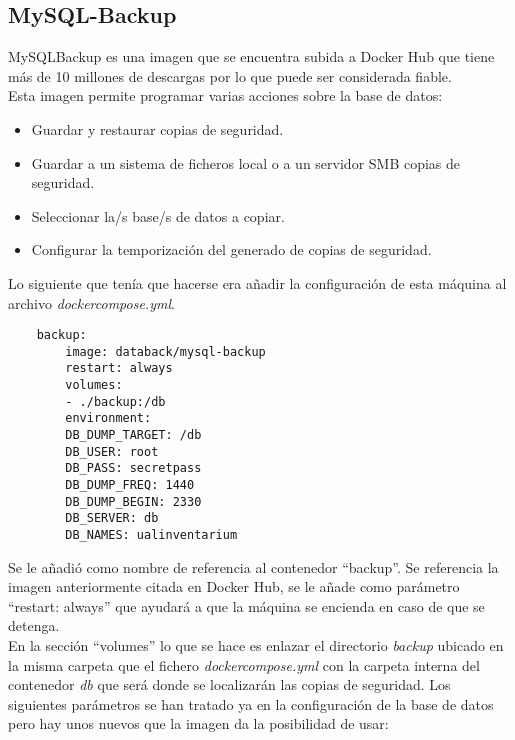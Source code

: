 \subsection{MySQL-Backup}
MySQL\-Backup es una imagen que se encuentra subida a Docker Hub que tiene más de 10 millones de descargas por lo que puede ser considerada fiable.
\\Esta imagen permite programar varias acciones sobre la base de datos:
\begin{itemize}
    \item Guardar y restaurar copias de seguridad.
    \item Guardar a un sistema de ficheros local o a un servidor SMB copias de seguridad.
    \item Seleccionar la/s base/s de datos a copiar.
    \item Configurar la temporización del generado de copias de seguridad.
\end{itemize}
Lo siguiente que tenía que hacerse era añadir la configuración de esta máquina al archivo \textit{docker\-compose.yml}.
\begin{verbatim}
    backup:
        image: databack/mysql-backup
        restart: always
        volumes:
        - ./backup:/db
        environment:
        DB_DUMP_TARGET: /db
        DB_USER: root
        DB_PASS: secretpass
        DB_DUMP_FREQ: 1440
        DB_DUMP_BEGIN: 2330
        DB_SERVER: db
        DB_NAMES: ualinventarium
\end{verbatim}
Se le añadió como nombre de referencia al contenedor ``backup''. Se referencia la imagen anteriormente citada en Docker Hub, se le añade como parámetro ``restart: always'' que ayudará a que la máquina se encienda en caso de que se detenga.
\\En la sección ``volumes'' lo que se hace es enlazar el directorio \textit{backup} ubicado en la misma carpeta que el fichero \textit{docker\-compose.yml} con la carpeta interna del contenedor \textit{db} que será donde se localizarán las copias de seguridad. Los siguientes parámetros se han tratado ya en la configuración de la base de datos pero hay unos nuevos que la imagen da la posibilidad de usar:

